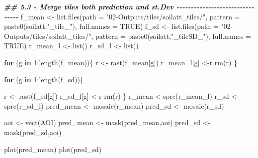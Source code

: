 \documentclass[
  10pt,
  b5paper,
  oneside]{book}
\newenvironment{Shaded}{\begin{snugshade}}{\end{snugshade}}
\newcommand{\AttributeTok}[1]{\textcolor[rgb]{0.77,0.63,0.00}{#1}}
\newcommand{\ConstantTok}[1]{\textcolor[rgb]{0.00,0.00,0.00}{#1}}
\newcommand{\ControlFlowTok}[1]{\textcolor[rgb]{0.13,0.29,0.53}{\textbf{#1}}}
\newcommand{\DecValTok}[1]{\textcolor[rgb]{0.00,0.00,0.81}{#1}}
\newcommand{\DocumentationTok}[1]{\textcolor[rgb]{0.56,0.35,0.01}{\textbf{\textit{#1}}}}
\newcommand{\FunctionTok}[1]{\textcolor[rgb]{0.00,0.00,0.00}{#1}}
\newcommand{\NormalTok}[1]{#1}
\newcommand{\OtherTok}[1]{\textcolor[rgb]{0.56,0.35,0.01}{#1}}
\newcommand{\SpecialCharTok}[1]{\textcolor[rgb]{0.00,0.00,0.00}{#1}}
\newcommand{\StringTok}[1]{\textcolor[rgb]{0.31,0.60,0.02}{#1}}
\begin{document}
\begin{Shaded}
\begin{Highlighting}[]
\DocumentationTok{\#\# 5.3 {-} Merge tiles both prediction and st.Dev {-}{-}{-}{-}{-}{-}{-}{-}{-}{-}{-}{-}{-}{-}{-}{-}{-}{-}{-}{-}{-}{-}{-}{-}{-}{-}{-}{-}{-}{-}{-}{-}}
\NormalTok{f\_mean }\OtherTok{\textless{}{-}} \FunctionTok{list.files}\NormalTok{(}\AttributeTok{path =} \StringTok{"02{-}Outputs/tiles/soilatt\_tiles/"}\NormalTok{, }
                     \AttributeTok{pattern =} \FunctionTok{paste0}\NormalTok{(soilatt,}\StringTok{"\_tile\_"}\NormalTok{), }\AttributeTok{full.names =} \ConstantTok{TRUE}\NormalTok{)}
\NormalTok{f\_sd }\OtherTok{\textless{}{-}} \FunctionTok{list.files}\NormalTok{(}\AttributeTok{path =} \StringTok{"02{-}Outputs/tiles/soilatt\_tiles/"}\NormalTok{, }
                   \AttributeTok{pattern =}  \FunctionTok{paste0}\NormalTok{(soilatt,}\StringTok{"\_tileSD\_"}\NormalTok{), }\AttributeTok{full.names =} \ConstantTok{TRUE}\NormalTok{)}
\NormalTok{r\_mean\_l }\OtherTok{\textless{}{-}} \FunctionTok{list}\NormalTok{()}
\NormalTok{r\_sd\_l }\OtherTok{\textless{}{-}} \FunctionTok{list}\NormalTok{()}

\ControlFlowTok{for}\NormalTok{ (g }\ControlFlowTok{in} \DecValTok{1}\SpecialCharTok{:}\FunctionTok{length}\NormalTok{(f\_mean))\{}
\NormalTok{  r }\OtherTok{\textless{}{-}} \FunctionTok{rast}\NormalTok{(f\_mean[g])}
\NormalTok{  r\_mean\_l[g] }\OtherTok{\textless{}{-}}\NormalTok{r}
  \FunctionTok{rm}\NormalTok{(r)}
\NormalTok{\}}

\ControlFlowTok{for}\NormalTok{ (g }\ControlFlowTok{in} \DecValTok{1}\SpecialCharTok{:}\FunctionTok{length}\NormalTok{(f\_sd))\{}
  
\NormalTok{  r }\OtherTok{\textless{}{-}} \FunctionTok{rast}\NormalTok{(f\_sd[g])}
\NormalTok{  r\_sd\_l[g] }\OtherTok{\textless{}{-}}\NormalTok{r}
  \FunctionTok{rm}\NormalTok{(r)}
\NormalTok{\}}
\NormalTok{r\_mean }\OtherTok{\textless{}{-}}\FunctionTok{sprc}\NormalTok{(r\_mean\_l)}
\NormalTok{r\_sd }\OtherTok{\textless{}{-}}\FunctionTok{sprc}\NormalTok{(r\_sd\_l)}
\NormalTok{pred\_mean }\OtherTok{\textless{}{-}} \FunctionTok{mosaic}\NormalTok{(r\_mean)}
\NormalTok{pred\_sd }\OtherTok{\textless{}{-}} \FunctionTok{mosaic}\NormalTok{(r\_sd)}

\NormalTok{aoi }\OtherTok{\textless{}{-}} \FunctionTok{vect}\NormalTok{(AOI)}
\NormalTok{pred\_mean }\OtherTok{\textless{}{-}} \FunctionTok{mask}\NormalTok{(pred\_mean,aoi)}
\NormalTok{pred\_sd }\OtherTok{\textless{}{-}} \FunctionTok{mask}\NormalTok{(pred\_sd,aoi)}


\FunctionTok{plot}\NormalTok{(pred\_mean)}
\FunctionTok{plot}\NormalTok{(pred\_sd)}
\end{Highlighting}
\end{Shaded}
\end{document}
